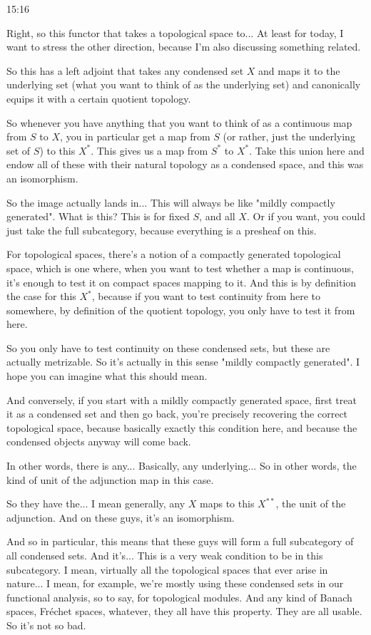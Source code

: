 \begin{unfinished}{15:16}
\begin{example}
\begin{remark}
\begin{remark}
\end{remark}

Right, so this functor that takes a topological space to... At least for today, I want to stress the other direction, because I'm also discussing something related.

So this has a left adjoint that takes any condensed set $X$ and maps it to the underlying set (what you want to think of as the underlying set) and canonically equips it with a certain quotient topology.

So whenever you have anything that you want to think of as a continuous map from $S$ to $X$, you in particular get a map from $S$ (or rather, just the underlying set of $S$) to this $X^*$. This gives us a map from $S^*$ to $X^*$. Take this union here and endow all of these with their natural topology as a condensed space, and this was an isomorphism.

So the image actually lands in... This will always be like "mildly compactly generated". What is this? This is for fixed $S$, and all $X$. Or if you want, you could just take the full subcategory, because everything is a presheaf on this.

For topological spaces, there's a notion of a compactly generated topological space, which is one where, when you want to test whether a map is continuous, it's enough to test it on compact spaces mapping to it. And this is by definition the case for this $X^*$, because if you want to test continuity from here to somewhere, by definition of the quotient topology, you only have to test it from here.

So you only have to test continuity on these condensed sets, but these are actually metrizable. So it's actually in this sense "mildly compactly generated". I hope you can imagine what this should mean.

And conversely, if you start with a mildly compactly generated space, first treat it as a condensed set and then go back, you're precisely recovering the correct topological space, because basically exactly this condition here, and because the condensed objects anyway will come back.

In other words, there is any... Basically, any underlying... So in other words, the kind of unit of the adjunction map in this case.

So they have the... I mean generally, any $X$ maps to this $X^{**}$, the unit of the adjunction. And on these guys, it's an isomorphism.

And so in particular, this means that these guys will form a full subcategory of all condensed sets. And it's... This is a very weak condition to be in this subcategory. I mean, virtually all the topological spaces that ever arise in nature... I mean, for example, we're mostly using these condensed sets in our functional analysis, so to say, for topological modules. And any kind of Banach spaces, Fréchet spaces, whatever, they all have this property. They are all usable. So it's not so bad.



\end{remark}
\end{example}
\end{unfinished}
